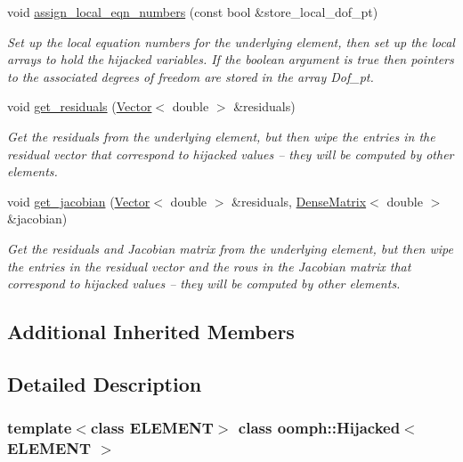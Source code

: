 \begin{DoxyCompactItemize}
void \hyperlink{classoomph_1_1Hijacked_afd4a5578291487aa37b0931dab845701}{assign\+\_\+local\+\_\+eqn\+\_\+numbers} (const bool \&store\+\_\+local\+\_\+dof\+\_\+pt)
\begin{DoxyCompactList}\small\item\em Set up the local equation numbers for the underlying element, then set up the local arrays to hold the hijacked variables. If the boolean argument is true then pointers to the associated degrees of freedom are stored in the array Dof\+\_\+pt. \end{DoxyCompactList}\item 
void \hyperlink{classoomph_1_1Hijacked_adb1760705326df86f6289cc3774d37b9}{get\+\_\+residuals} (\hyperlink{classoomph_1_1Vector}{Vector}$<$ double $>$ \&residuals)
\begin{DoxyCompactList}\small\item\em Get the residuals from the underlying element, but then wipe the entries in the residual vector that correspond to hijacked values -- they will be computed by other elements. \end{DoxyCompactList}\item 
void \hyperlink{classoomph_1_1Hijacked_a35778dccc9cf036c37ee569efe5b5f7c}{get\+\_\+jacobian} (\hyperlink{classoomph_1_1Vector}{Vector}$<$ double $>$ \&residuals, \hyperlink{classoomph_1_1DenseMatrix}{Dense\+Matrix}$<$ double $>$ \&jacobian)
\begin{DoxyCompactList}\small\item\em Get the residuals and Jacobian matrix from the underlying element, but then wipe the entries in the residual vector and the rows in the Jacobian matrix that correspond to hijacked values -- they will be computed by other elements. \end{DoxyCompactList}\end{DoxyCompactItemize}
\subsection*{Additional Inherited Members}


\subsection{Detailed Description}
\subsubsection*{template$<$class E\+L\+E\+M\+E\+NT$>$\newline
class oomph\+::\+Hijacked$<$ E\+L\+E\+M\+E\+N\+T $>$}

